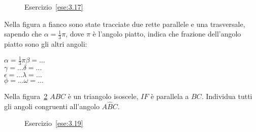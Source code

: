 \begin{figure}[htb]
\centering
\caption{Esercizio~\ref{ese:3.17}}\label{fig:ese3.17}
\end{figure}

\begin{esercizio}
\label{ese:3.18}
Nella figura a fianco sono state tracciate due rette parallele e una trasversale, sapendo che $\alpha=\frac{1}{3}\pi$, dove $\pi$ è l'angolo piatto, indica che frazione dell'angolo piatto sono gli altri angoli:\\
\noindent\begin{minipage}{.5\textwidth}
$\alpha=\frac{1}{3}\pi$\tab\tab $\beta = \ldots$\\
$\gamma=\ldots$\tab\tab $\delta = \ldots$\\
$\epsilon=\ldots$\tab\tab $\lambda = \ldots$\\
$\phi=\ldots$\tab\tab $\omega = \ldots$
\end{minipage}\hfil
\begin{minipage}{.5\textwidth}
\centering
\end{minipage}
\end{esercizio}

\begin{esercizio}
\label{ese:3.19}
Nella figura~\ref{fig:ese3.19} $ABC$ è un triangolo isoscele, $IF$ è parallela a $BC$. Individua tutti gli angoli congruenti all'angolo $A\widehat{B}C$.
\end{esercizio}

\begin{figure}[htb]
\centering
\caption{Esercizio~\ref{ese:3.19}}\label{fig:ese3.19}
\end{figure}

